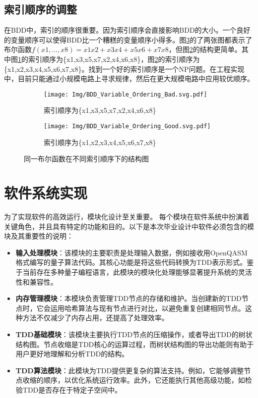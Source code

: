\subsection*{索引顺序的调整}
\label{contraction}在BDD中，索引的顺序很重要。因为索引顺序会直接影响BDD的大小。一个良好的变量顺序可以使得BDD比一个糟糕的变量顺序小得多。图\ref{fig:bdd-compare}的了两张图都表示了布尔函数$f (x1,...,x8)=x1x2+x3x4+x5x6+x7x8$，但图\ref{fig:bdd-good}的结构更简单。其中图\ref{fig:bdd-bad}的索引顺序为\{x1,x3,x5,x7,x2,x4,x6,x8\}，图\ref{fig:bdd-good}的索引顺序为\{x1,x2,x3,x4,x5,x6,x7,x8\}。找到一个好的索引顺序是一个NP问题。在工程实现中，目前只能通过小规模电路上寻求规律，然后在更大规模电路中应用较优顺序。
\begin{figure}[!htbp]
	\centering
	\begin{subfigure}[b]{.4\textwidth}
        \centering
        \texttt{[image: Img/BDD\_Variable\_Ordering\_Bad.svg.pdf]}
		\caption{索引顺序为\{x1,x3,x5,x7,x2,x4,x6,x8\}}
		\label{fig:bdd-bad}
	\end{subfigure}
    \qquad
	\begin{subfigure}[b]{.4\textwidth}
        \centering
        \texttt{[image: Img/BDD\_Variable\_Ordering\_Good.svg.pdf]}
		\caption{索引顺序为\{x1,x2,x3,x4,x5,x6,x7,x8\}}
		\label{fig:bdd-good}
	\end{subfigure}
	\caption{同一布尔函数在不同索引顺序下的结构图\citep{wiki:bdd}}
	\label{fig:bdd-compare}
\end{figure}

\section{软件系统实现}
为了实现软件的高效运行，模块化设计至关重要。
每个模块在软件系统中扮演着关键角色，并且具有特定的功能和目的。以下是本次毕业设计中软件必须包含的模块及其重要性的说明：
\begin{itemize}
    \item \textbf{输入处理模块}：该模块的主要职责是处理输入数据，例如接收用OpenQASM格式编写的量子算法代码。其核心功能是将这些代码转换为TDD表示形式。鉴于当前存在多种量子编程语言，此模块的模块化处理能够显著提升系统的灵活性和兼容性。
    \item \textbf{内存管理模块}：本模块负责管理TDD节点的存储和维护。当创建新的TDD节点时，它会运用哈希算法与现有节点进行对比，以避免重复创建相同节点。这种方法不仅减少了内存占用，还提高了处理效率。
    \item \textbf{TDD基础模块}：该模块主要执行TDD节点的压缩操作，或者导出TDD的树状结构图。节点收缩是TDD核心的运算过程，而树状结构图的导出功能则有助于用户更好地理解和分析TDD的结构。
    \item \textbf{TDD算法模块}：此模块为TDD提供更复杂的算法支持。例如，它能够调整节点收缩的顺序，以优化系统运行效率。此外，它还能执行其他高级功能，如检验TDD是否存在于特定子空间中。
\end{itemize}
